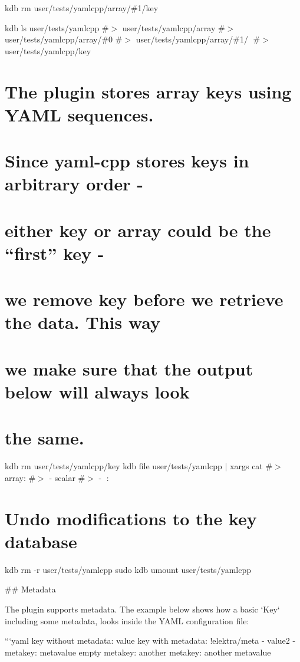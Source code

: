 kdb rm user/tests/yamlcpp/array/\#1/key

kdb ls user/tests/yamlcpp \#$>$ user/tests/yamlcpp/array \#$>$ user/tests/yamlcpp/array/\#0 \#$>$ user/tests/yamlcpp/array/\#1/🔑 \#$>$ user/tests/yamlcpp/key

\section*{The plugin stores array keys using Y\+A\+ML sequences.}

\section*{Since yaml-\/cpp stores keys in arbitrary order -\/}

\section*{either {\ttfamily key} or {\ttfamily array} could be the “first” key -\/}

\section*{we remove {\ttfamily key} before we retrieve the data. This way}

\section*{we make sure that the output below will always look}

\section*{the same.}

kdb rm user/tests/yamlcpp/key kdb file user/tests/yamlcpp $\vert$ xargs cat \#$>$ array\+: \#$>$ -\/ scalar \#$>$ -\/ 🔑\+: 🙈

\section*{Undo modifications to the key database}

kdb rm -\/r user/tests/yamlcpp sudo kdb umount user/tests/yamlcpp 
\begin{DoxyCode}
## Metadata

The plugin supports metadata. The example below shows how a basic `Key` including some metadata, looks
       inside the YAML configuration file:

```yaml
key without metadata: value
key with metadata: !elektra/meta
  - value2
  - metakey: metavalue
    empty metakey:
    another metakey: another metavalue
\end{DoxyCode}


